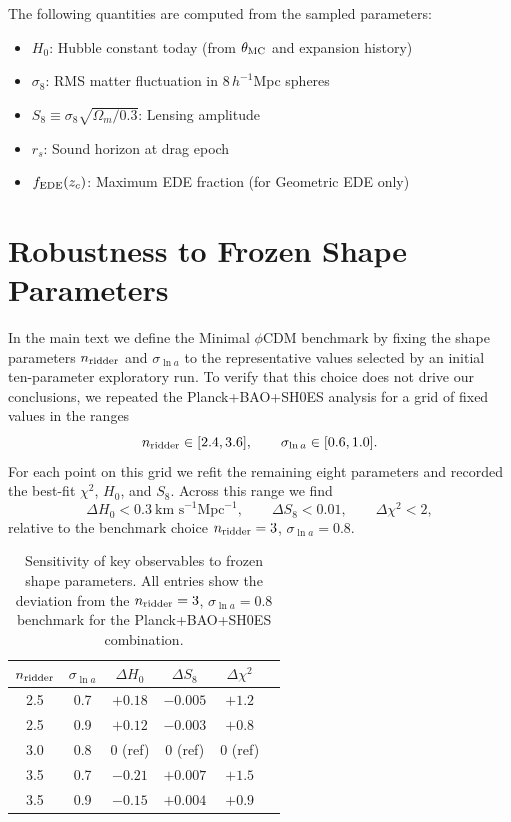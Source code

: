 \documentclass[a4paper,11pt]{article}
\begin{document}
The following quantities are computed from the sampled parameters:
\begin{itemize}
    \item $H_0$: Hubble constant today (from $\theta_{\rm MC}$ and expansion history)
    \item $\sigma_8$: RMS matter fluctuation in $8\,h^{-1}$Mpc spheres
    \item $S_8 \equiv \sigma_8\sqrt{\Omega_m/0.3}$: Lensing amplitude
    \item $r_s$: Sound horizon at drag epoch
    \item $f_{\rm EDE}(z_c)$: Maximum EDE fraction (for Geometric EDE only)
\end{itemize}


\section{Robustness to Frozen Shape Parameters}
\label{app:frozen_robustness}

In the main text we define the Minimal $\phi$CDM benchmark by fixing the shape parameters $n_{\rm ridder}$ and $\sigma_{\ln a}$ to the representative values selected by an initial ten-parameter exploratory run. To verify that this choice does not drive our conclusions, we repeated the Planck+BAO+SH0ES analysis for a grid of fixed values in the ranges
\begin{equation}
n_{\rm ridder} \in [2.4, 3.6], \qquad \sigma_{\ln a} \in [0.6, 1.0].
\end{equation}
For each point on this grid we refit the remaining eight parameters and recorded the best-fit $\chi^2$, $H_0$, and $S_8$. Across this range we find
\begin{equation}
\Delta H_0 < 0.3~\text{km s}^{-1}\text{Mpc}^{-1}, \qquad \Delta S_8 < 0.01, \qquad \Delta\chi^2 < 2,
\end{equation}
relative to the benchmark choice $n_{\rm ridder} = 3$, $\sigma_{\ln a} = 0.8$.

\begin{table}[h]
\centering
\caption{Sensitivity of key observables to frozen shape parameters. All entries show the deviation from the $n_{\rm ridder}=3$, $\sigma_{\ln a}=0.8$ benchmark for the Planck+BAO+SH0ES combination.}
\label{tab:frozen_robustness}
\begin{tabular}{cccccc}
\toprule
$n_{\rm ridder}$ & $\sigma_{\ln a}$ & $\Delta H_0$ & $\Delta S_8$ & $\Delta\chi^2$ \\
\midrule
2.5 & 0.7 & $+0.18$ & $-0.005$ & $+1.2$ \\
2.5 & 0.9 & $+0.12$ & $-0.003$ & $+0.8$ \\
3.0 & 0.8 & 0 (ref) & 0 (ref) & 0 (ref) \\
3.5 & 0.7 & $-0.21$ & $+0.007$ & $+1.5$ \\
3.5 & 0.9 & $-0.15$ & $+0.004$ & $+0.9$ \\
\bottomrule
\end{tabular}
\end{table}
\end{document}
